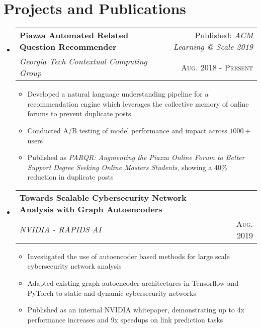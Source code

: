 \documentclass[letterpaper,11pt]{article}
\makeatletter
\newcommand{\resumePlainItem}[1]{
  \item\small{#1 \vspace{-2pt}}
}
\newcommand{\resumeSubheading}[4]{
  \vspace{-1pt}\item[]
    \begin{tabular*}{0.97\textwidth}{l@{\extracolsep{\fill}}r}
      \textbf{#1} & #2 \\
      \textit{\small#3} & \textsc{\small #4} \\ %
    \end{tabular*}\vspace{-5pt}
}
\newcommand{\resumeSubHeadingListStart}{\begin{itemize}[leftmargin=*]}
\newcommand{\resumeSubHeadingListEnd}{\end{itemize}}
\newcommand{\resumeItemListStart}{\begin{itemize}}
\newcommand{\resumeItemListEnd}{\end{itemize}\vspace{-5pt}}
\newenvironment{resumeItemList}{\resumeItemListStart}{\resumeItemListEnd}
\newenvironment{resumeSubheadingList}{\resumeSubHeadingListStart}{\resumeSubHeadingListEnd}
\makeatother
\begin{document}
\section{Projects and Publications}
  \begin{resumeSubheadingList}
    \resumeSubheading
    {Piazza Automated Related Question Recommender}{Published: \textit{ACM Learning @ Scale 2019}}
    {Georgia Tech Contextual Computing Group}{Aug. 2018 - Present}
    \begin{resumeItemList}
      \resumePlainItem{Developed a natural language understanding pipeline for a recommendation engine which leverages the collective memory of online forums to prevent duplicate posts}
      \resumePlainItem{Conducted A/B testing of model performance and impact across $1000+$ users}
      \resumePlainItem{Published as \textit{PARQR: Augmenting the Piazza Online Forum to Better Support Degree Seeking Online Masters Students},
      showing a 40\% reduction in duplicate posts} %
    \end{resumeItemList}

    \resumeSubheading
    {Towards Scalable Cybersecurity Network Analysis with Graph Autoencoders}{}
    {NVIDIA - RAPIDS AI}{Aug. 2019}
    \begin{resumeItemList}
      \resumePlainItem{Investigated the use of autoencoder based methods for large scale cybersecurity network analysis}
      \resumePlainItem{Adapted existing graph autoencoder architectures in Tensorflow and PyTorch to static and dynamic
      cybersecurity networks}
      \resumePlainItem{Published as an internal NVIDIA whitepaper, demonstrating up to 4x performance increases and 
      9x speedups on link prediction tasks}
    \end{resumeItemList}


\end{resumeSubheadingList}
\end{document}

